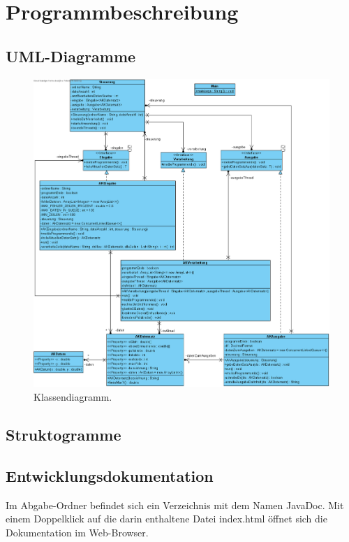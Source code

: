 \chapter{Programmbeschreibung}\label{ch:programmbeschreibung}

\section{UML-Diagramme}\label{sec:uml}
\begin{figure}[htb]
    \centering
    \includegraphics[width=\linewidth]{images/ClassDiagram1}
    \caption{
        Klassendiagramm.
    }
    \label{fig:klassen-dia}
\end{figure}

\section{Struktogramme}\label{sec:strukto}


\section{Entwicklungsdokumentation}\label{sec:entwicklerdokumentation}
Im Abgabe-Ordner befindet sich ein Verzeichnis mit dem Namen \glqq JavaDoc\grqq{}.
Mit einem Doppelklick auf die darin enthaltene Datei \glqq index.html\grqq{} öffnet sich die Dokumentation im Web-Browser.